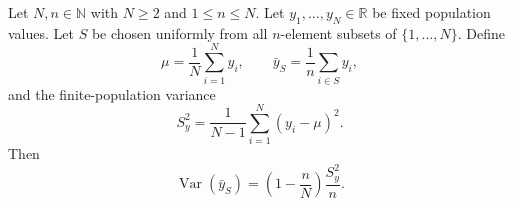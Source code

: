 \begin{theorem}
Let $N,n\in\mathbb{N}$ with $N\ge 2$ and $1\le n\le N$. Let
$y_1,\ldots,y_N\in\mathbb{R}$ be fixed population values. Let $S$ be chosen
uniformly from all $n$-element subsets of $\{1,\ldots,N\}$.
Define
\[
\mu=\frac{1}{N}\sum_{i=1}^N y_i,\qquad
\bar y_S=\frac{1}{n}\sum_{i\in S}y_i,
\]
and the finite-population variance
\[
S_y^2=\frac{1}{N-1}\sum_{i=1}^N (y_i-\mu)^2.
\]
Then
\[
\operatorname{Var}(\bar y_S)
=
\left(1-\frac{n}{N}\right)\frac{S_y^2}{n}.
\]
\end{theorem}

